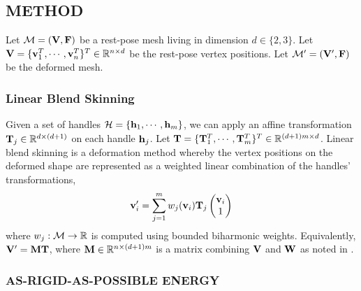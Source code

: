 \subsection*{METHOD}

Let $\mathcal{M} = (\mathbf{V}, \mathbf{F})$ be a rest-pose mesh living in dimension $d\in\{2,3\}$. Let $\mathbf{V} = \{\mathbf{v}_1^T, \cdots, \mathbf{v}_n^T\}^T \in \mathbb{R}^{n \times d}$ be the rest-pose vertex positions. Let $\mathcal{M}' = (\mathbf{V}', \mathbf{F})$ be the deformed mesh.

\subsubsection*{Linear Blend Skinning}

Given a set of handles $\mathcal{H} = \{ \mathbf{h}_1, \cdots, \mathbf{h}_m \}$, we can apply an affine transformation $\mathbf{T}_j \in \mathbb{R}^{d \times (d+1)}$ on each handle $\mathbf{h}_j$. Let $\mathbf{T} = \{ \mathbf{T}_1^T, \cdots, \mathbf{T}_m^T \}^T \in \mathbb{R}^{(d+1)m \times d}$. Linear blend skinning is a deformation method whereby the vertex positions on the deformed shape are represented as a weighted linear combination of the handles' transformations,
\[
    \mathbf{v}_i' = \sum_{j=1}^m w_j(\mathbf{v}_i) \mathbf{T}_j 
    \begin{pmatrix} 
    \mathbf{v}_i \\
    1 
    \end{pmatrix} 
\]
where $w_j: \mathcal{M} \rightarrow \mathbb{R}$ is computed using bounded biharmonic weights.\cite{jacobson_bounded_biharmonic_weights_2011} Equivalently, $\mathbf{V}' = \mathbf{M} \mathbf{T}$, where $\mathbf{M} \in \mathbb{R}^{n \times (d+1)m}$ is a matrix combining $\mathbf{V}$ and $\mathbf{W}$ as noted in \cite{jacobson_fast_2012}. 





\subsubsection*{AS-RIGID-AS-POSSIBLE ENERGY}

